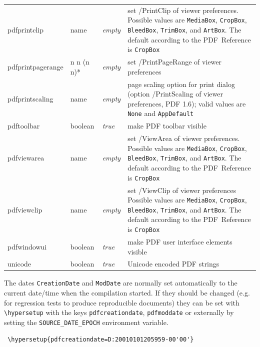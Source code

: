 \documentclass{article}
\begin{document}
\begin{longtable}{@{}>{\ttfamily}l>{\raggedright}p{}>{\itshape}lp{7cm}@{}}
pdfprintclip       & name    & empty & set /PrintClip of viewer preferences.  Possible values are
                                       \verb|MediaBox|, \verb|CropBox|,
                                       \verb|BleedBox|, \verb|TrimBox|, and \verb|ArtBox|.
                                       The default according to the PDF~Reference is \verb|CropBox| \\
pdfprintpagerange  & n n (n n)*
                             & empty & set /PrintPageRange of viewer preferences\\
pdfprintscaling    & name    & empty & page scaling option for print dialog
                                       (option /PrintScaling of viewer
                                       preferences, PDF 1.6);
                                       valid values are \verb|None| and
                                       \verb|AppDefault| \\
pdftoolbar         & boolean & true  & make PDF toolbar visible \\
pdfviewarea        & name    & empty & set /ViewArea of viewer preferences. Possible values are
                                       \verb|MediaBox|, \verb|CropBox|,
                                       \verb|BleedBox|, \verb|TrimBox|, and \verb|ArtBox|.
                                       The default according to the PDF~Reference is \verb|CropBox| \\
pdfviewclip        & name    & empty & set /ViewClip of viewer preferences Possible values are
                                       \verb|MediaBox|, \verb|CropBox|,
                                       \verb|BleedBox|, \verb|TrimBox|, and \verb|ArtBox|.
                                       The default according to the PDF~Reference is \verb|CropBox| \\
pdfwindowui        & boolean & true  & make PDF user interface elements visible \\
unicode            & boolean & true & Unicode encoded PDF strings
\end{longtable}

 The dates \verb|CreationDate| and \verb|ModDate|
 are normally set automatically to the current date/time when the compilation
 started. If they should be changed
 (e.g. for regression tests to produce reproducible documents) they can
 be set with \verb|\hypersetup| with the keys
 \verb|pdfcreationdate|, \verb|pdfmoddate| or externally by setting the \verb|SOURCE_DATE_EPOCH| environment variable.

 \begin{verbatim}
 \hypersetup{pdfcreationdate=D:20010101205959-00'00'}
 \end{verbatim}
\end{document}
